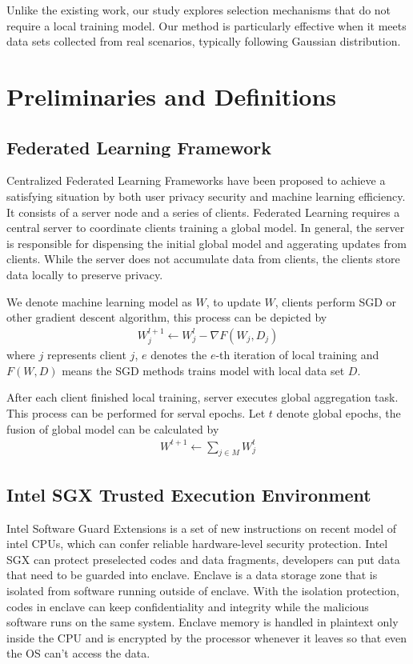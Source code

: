 \documentclass[conference]{IEEEtran}
\begin{document}
Unlike the existing work, our study explores selection mechanisms that do not require a local training model. Our method is particularly effective when it meets data sets collected from real scenarios, typically following Gaussian distribution. 
\section{Preliminaries and Definitions}
\subsection{Federated Learning Framework}
Centralized Federated Learning Frameworks have been proposed to achieve a satisfying situation by both user privacy security and machine learning efficiency. It consists of a server node and a series of clients. Federated Learning requires a central server to coordinate clients training a global model. In general, the server is responsible for dispensing the initial global model and aggerating updates from clients. While the server does not accumulate data from clients, the clients store data locally to preserve privacy. 

We denote machine learning model as $W$, to update $W$, clients perform SGD or other gradient descent algorithm, this process can be depicted by
\begin{align}
  W_{j}^{l+1} \gets W_{j}^{l} - \nabla F(W_{j},D_{j})
\end{align}
where $j$ represents client $j$, $e$ denotes the $e$-th iteration of local training and $F(W,D)$ means the SGD methods trains model with local data set $D$.

After each client finished local training, 
server executes global aggregation task. 
This process can be performed for serval epochs. Let $t$ denote global epochs, 
the fusion of global model can be calculated by
  \begin{align}
    W^{t+1} \gets \sum\limits_{j \in M} W^t_{j} 
  \end{align}
\subsection{Intel SGX Trusted Execution Environment}
Intel Software Guard Extensions\cite{costan2016intel} is a set of new instructions on recent model of intel CPUs,
which can confer reliable hardware-level security protection. Intel SGX can protect 
preselected codes and data fragments, developers can put data that need to be guarded into 
enclave. Enclave is a data storage zone that is isolated from software running outside of 
enclave. With the isolation protection, codes in enclave can keep confidentiality and 
integrity while the malicious software runs on the same system. Enclave memory is handled 
in plaintext only inside the CPU and is encrypted by the processor whenever it leaves so 
that even the OS can't access the data.
\end{document}
